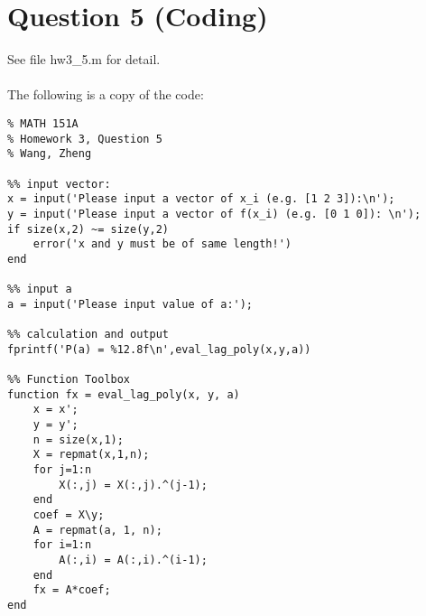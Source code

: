 \documentclass[11pt]{article}
\begin{document}
\section*{Question 5 (Coding)}
See file hw3\_5.m for detail.\\\\
The following is a copy of the code:
\begin{verbatim}
% MATH 151A 
% Homework 3, Question 5
% Wang, Zheng

%% input vector:
x = input('Please input a vector of x_i (e.g. [1 2 3]):\n');
y = input('Please input a vector of f(x_i) (e.g. [0 1 0]): \n');
if size(x,2) ~= size(y,2)
    error('x and y must be of same length!')
end

%% input a
a = input('Please input value of a:');

%% calculation and output
fprintf('P(a) = %12.8f\n',eval_lag_poly(x,y,a))

%% Function Toolbox
function fx = eval_lag_poly(x, y, a)
    x = x';
    y = y';
    n = size(x,1);
    X = repmat(x,1,n);
    for j=1:n
        X(:,j) = X(:,j).^(j-1);
    end
    coef = X\y;
    A = repmat(a, 1, n);
    for i=1:n
        A(:,i) = A(:,i).^(i-1);
    end
    fx = A*coef;
end

\end{verbatim}
\end{document}
